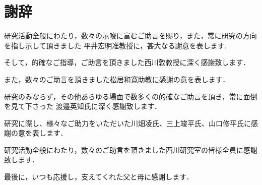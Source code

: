 
\chapter*{謝辞}
研究活動全般にわたり，数々の示唆に富むご助言を賜り，また，常に研究の方向を指し示して頂きました
平井宏明准教授に，甚大なる謝意を表します.

そして，的確なご指導，ご助言を頂きました西川敦教授に深く感謝致します．

また，数々のご助言を頂きました松居和寛助教に感謝の意を表します．

研究のみならず，その他あらゆる場面で数多くの的確なご助言を頂き，常に面倒を見て下さった
渡邉英知氏に深く感謝致します．

研究に際し、様々なご助力をいただいた川畑凌氏、三上竣平氏、山口修平氏に感謝の意を表します．

研究活動全般にわたり，数々のご助言を頂きました西川研究室の皆様全員に感謝致します．

最後に，いつも応援し，支えてくれた父と母に感謝します．
